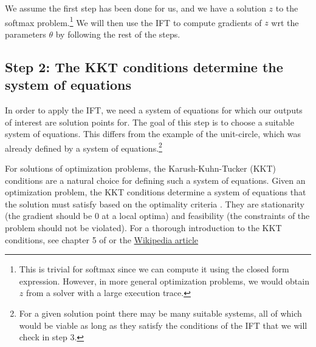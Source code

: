 \documentclass[11pt]{article}
\begin{document}
We assume the first step has been done for us,
and we have a solution $z$ to the softmax problem.\footnote{
This is trivial for softmax since we can compute it using the closed form
expression.
However, in more general optimization problems, we would obtain $z$ from a solver
with a large execution trace.}
We will then use the IFT to compute gradients of $z$ wrt the parameters $\theta$
by following the rest of the steps.

\subsection*{Step 2: The KKT conditions determine the system of equations}
In order to apply the IFT,
we need a system of equations for which our outputs of interest are solution points for.
The goal of this step is to choose a suitable system of equations.
This differs from the example of the unit-circle, which was already defined by
a system of equations.\footnote{
For a given solution point there may be many suitable systems,
all of which would be viable as long as they satisfy
the conditions of the IFT that we will check in step 3.
}

For solutions of optimization problems, the Karush-Kuhn-Tucker (KKT) conditions
are a natural choice for defining such a system of equations.
Given an optimization problem, the KKT conditions
determine a system of equations that the solution must satisfy
based on the optimality criteria \citep{kkt-thesis,kkt}.
They are stationarity (the gradient should be 0 at a local optima)
and feasibility (the constraints of the problem should not be violated).
For a thorough introduction to the KKT conditions, see chapter 5 of \citet{bv-cvxbook}
or the \href{https://en.wikipedia.org/wiki/Karush-Kuhn-Tucker\_conditions}{Wikipedia article}
\end{document}
